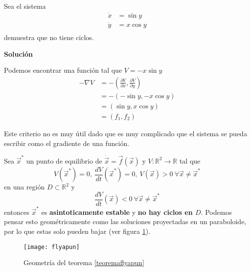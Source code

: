 \begin{ejemplo} Sea el sistema
  $$
  \begin{aligned}
    \dot{x} &= \sin y  \\
    \dot{y} &= x\cos y \\ 
  \end{aligned}
  $$
  demuestra que no tiene ciclos.

  \begin{tcolorbox}[colback=Black!4, colframe=White, arc = 2mm]
  \textbf{Solución}

  Podemos encontrar una función tal que $V = -x\sin y$
  $$
  \begin{aligned}
    -\nabla V &= - \left( \frac{\partial V}{\partial x} , \frac{\partial V}{\partial y}  \right)   \\
    &= -(-\sin y , -x\cos y) \\
    &= (\sin y, x\cos y) \\
    &= (f_1,f_2) 
  \end{aligned}
  $$
  \end{tcolorbox}
\end{ejemplo}
\begin{tcolorbox}[colback=Black!4, colframe=White, arc=2mm]
\begin{nota} Este criterio no es muy útil dado que es muy complicado que el sistema se pueda escribir como el gradiente de una función.
\end{nota}
\end{tcolorbox}
\begin{tcolorbox}[colback=Black!4,colframe=White, arc=2mm]
  \begin{teorema} Sea $\vec{x}^*$ un punto de equilibrio de $\dot{\vec{x}}=\vec{f}(\vec{x})$ y $V: \mathbb{R}^2 \to \mathbb{R} $ tal que $$
  V(\vec{x}^*)=0,\ \frac{dV}{dt}(\vec{x}^*)=0,\ V(\vec{x})>0 \ \forall \vec{x} \neq \vec{x}^* $$ en una región $D \subset \mathbb{R}^2$ y $$\frac{dV}{dt}(\vec{x})<0 \ \forall \vec{x} \neq \vec{x}^*$$ entonces $\vec{x}^*$ es \textbf{asintoticamente estable} y \textbf{no hay ciclos en $D$}. Podemos pensar esto geométricamente como las soluciones proyectadas en un paraboloide, por lo que estas solo pueden bajar (ver figura  \ref{flyapun}).
  \label{teoremaflyapun}
\end{teorema}
\end{tcolorbox}

\begin{figure}[htpb]
  \centering
  \texttt{[image: flyapun]}
  \caption{Geometría del teorema \ref{teoremaflyapun}}
  \label{flyapun}
\end{figure}

